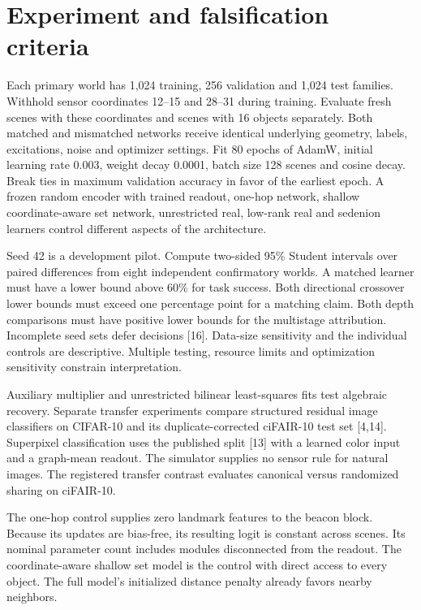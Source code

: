 \documentclass[10pt]{article}
\begin{document}
\section{Experiment and falsification criteria}
Each primary world has 1,024 training, 256 validation and 1,024 test families. Withhold sensor coordinates 12--15 and 28--31 during training. Evaluate fresh scenes with these coordinates and scenes with 16 objects separately. Both matched and mismatched networks receive identical underlying geometry, labels, excitations, noise and optimizer settings. Fit 80 epochs of AdamW, initial learning rate 0.003, weight decay 0.0001, batch size 128 scenes and cosine decay. Break ties in maximum validation accuracy in favor of the earliest epoch. A frozen random encoder with trained readout, one-hop network, shallow coordinate-aware set network, unrestricted real, low-rank real and sedenion learners control different aspects of the architecture.

Seed 42 is a development pilot. Compute two-sided 95\% Student intervals over paired differences from eight independent confirmatory worlds. A matched learner must have a lower bound above 60\% for task success. Both directional crossover lower bounds must exceed one percentage point for a matching claim. Both depth comparisons must have positive lower bounds for the multistage attribution. Incomplete seed sets defer decisions [16]. Data-size sensitivity and the individual controls are descriptive. Multiple testing, resource limits and optimization sensitivity constrain interpretation.

Auxiliary multiplier and unrestricted bilinear least-squares fits test algebraic recovery. Separate transfer experiments compare structured residual image classifiers on CIFAR-10 and its duplicate-corrected ciFAIR-10 test set [4,14]. Superpixel classification uses the published split [13] with a learned color input and a graph-mean readout. The simulator supplies no sensor rule for natural images. The registered transfer contrast evaluates canonical versus randomized sharing on ciFAIR-10.

The one-hop control supplies zero landmark features to the beacon block. Because its updates are bias-free, its resulting logit is constant across scenes. Its nominal parameter count includes modules disconnected from the readout. The coordinate-aware shallow set model is the control with direct access to every object. The full model's initialized distance penalty already favors nearby neighbors.
\end{document}

